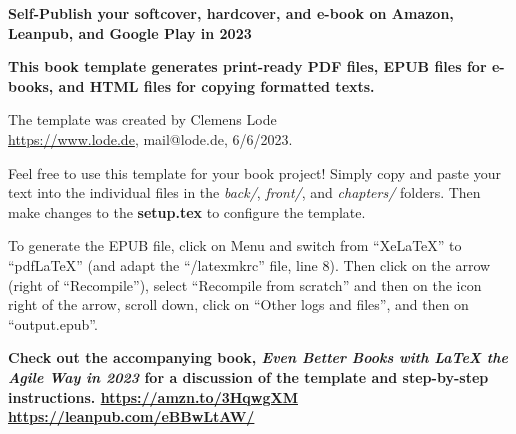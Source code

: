 

\thispagestyle{empty}

\begin{center}

    {\bfseries \sffamily \Huge Self-Publish your softcover, hardcover, and e-book on Amazon, Leanpub, and Google Play in 2023\par
    \bfseries \LARGE This book template generates print-ready PDF files, EPUB files for e-books, and HTML files for copying formatted texts.\par}
    
    \sffamily The template was created by Clemens Lode\\ \url{https://www.lode.de}, mail@lode.de, 6/6/2023.
    
    Feel free to use this template for your book project! Simply copy and paste your text into the individual files in the \textit{back/}, \textit{front/}, and \textit{chapters/} folders. Then make changes to the \textbf{setup.tex} to configure the template. 
    
    To generate the EPUB file, click on Menu and switch from ``XeLaTeX'' to ``pdfLaTeX'' (and adapt the ``/latexmkrc'' file, line 8). Then click on the arrow (right of ``Recompile''), select ``Recompile from scratch'' and then on the icon right of the arrow, scroll down, click on ``Other logs and files'', and then on ``output.epub''.\par
    
    \bfseries \LARGE Check out the accompanying book, {\color{red} \textit{Even Better Books with LaTeX the Agile Way in 2023}} for a discussion of the template and step-by-step instructions. {\color{red} \url{https://amzn.to/3HqwgXM} \url{https://leanpub.com/eBBwLtAW/}}\par
\end{center}